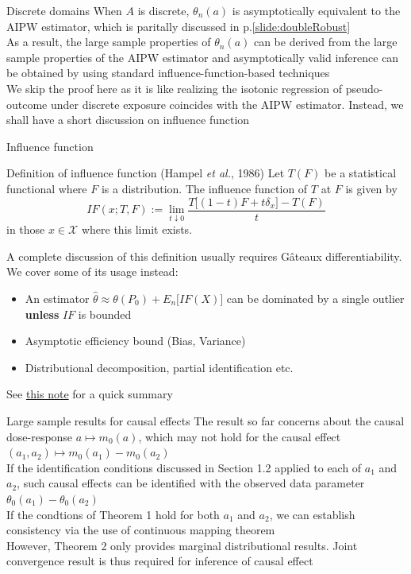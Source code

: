 \documentclass{beamer}
\newcommand{\f}[2]{\frac{#1}{#2}}
\newcommand{\vs}[1]{\vspace{#1 cm}}
\begin{document}
\begin{frame}{Discrete domains}
  When $A$ is discrete, $\theta_n(a)$ is asymptotically equivalent to the AIPW estimator, which is paritally discussed in p.\ref{slide:doubleRobust} \\
  \vs{0.5}
  As a result, the large sample properties of $\theta_n(a)$ can be derived from the large sample properties of the AIPW estimator and asymptotically valid inference can be obtained by using standard influence-function-based techniques \\
  \vs{0.5}
  We skip the proof here as it is like realizing the isotonic regression of pseudo-outcome under discrete exposure coincides with the AIPW estimator. Instead, we shall have a short discussion on influence function
\end{frame}

\begin{frame}{Influence function}
  \begin{block}{Definition of influence function (Hampel \textit{et al.}, 1986)}
    Let $T(F)$ be a statistical functional where $F$ is a distribution. The influence function of $T$ at $F$ is given by
    $$IF(x;T,F) := \lim_{t \downarrow 0} \f{T\big[ (1-t)F +t \delta_x \big] -T(F)}{t}$$
    in those $x \in \mathcal{X}$ where this limit exists.
  \end{block}
  A complete discussion of this definition usually requires G\^{a}teaux differentiability. We cover some of its usage instead:
  \begin{itemize}
    \item An estimator $\hat{\theta} \approx \theta(P_0) +E_n\big[ IF(X) \big]$ can be dominated by a single outlier \textbf{unless} $IF$ is bounded
    \item Asymptotic efficiency bound (Bias, Variance)
    \item Distributional decomposition, partial identification etc.
  \end{itemize}
  See \href{https://scholar.harvard.edu/files/kasy/files/ifhandout.pdf}{this note} for a quick summary
\end{frame}

\begin{frame}{Large sample results for causal effects}
  The result so far concerns about the causal dose-response $a \mapsto m_0(a)$, which may not hold for the causal effect $(a_1, a_2) \mapsto m_0(a_1) -m_0(a_2)$ \\
  \vs{0.3}
  If the identification conditions discussed in Section 1.2 applied to each of $a_1$ and $a_2$, such causal effects can be identified with the observed data parameter $\theta_0(a_1) -\theta_0(a_2)$ \\
  \vs{0.3}
  If the condtions of Theorem 1 hold for both $a_1$ and $a_2$, we can establish consistency via the use of continuous mapping theorem \\
  \vs{0.3}
  However, Theorem 2 only provides marginal distributional results. Joint convergence result is thus required for inference of causal effect
\end{frame}
\end{document}
